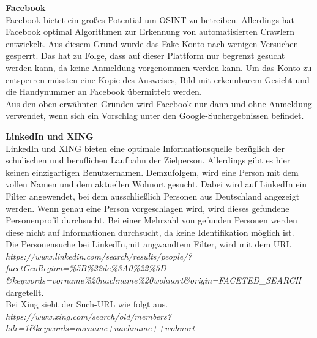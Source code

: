 			\textbf{Facebook}\\
			Facebook bietet ein großes Potential um OSINT zu betreiben. Allerdings hat Facebook optimal Algorithmen zur Erkennung von automatisierten Crawlern entwickelt. Aus diesem Grund wurde das Fake-Konto nach wenigen Versuchen gesperrt. Das hat zu Folge, dass auf dieser Plattform nur begrenzt gesucht werden kann, da keine Anmeldung vorgenommen werden kann. Um das Konto zu entsperren müssten eine Kopie des Ausweises, Bild mit erkennbarem Gesicht und die Handynummer an Facebook übermittelt werden.\\
			Aus den oben erwähnten Gründen wird Facebook nur dann und ohne Anmeldung verwendet, wenn sich ein Vorschlag unter den Google-Suchergebnissen befindet.

			\textbf{LinkedIn und XING}\\
			LinkedIn und XING bieten eine optimale Informationsquelle bezüglich der schulischen und beruflichen Laufbahn der Zielperson. Allerdings gibt es hier keinen einzigartigen Benutzernamen. Demzufolgem, wird eine Person mit dem vollen Namen und dem aktuellen Wohnort gesucht. Dabei wird auf LinkedIn ein Filter angewendet, bei dem ausschließlich Personen aus Deutschland angezeigt werden. Wenn genau eine Person vorgeschlagen wird, wird dieses gefundene Personenprofil durchsucht. Bei einer Mehrzahl von gefunden Personen werden diese nicht auf Informationen durchsucht, da keine Identifikation möglich ist.\\
			Die Personensuche bei LinkedIn,mit angwandtem Filter, wird mit dem URL\\ \textit{https://www.linkedin.com/search/results/people/?facetGeoRegion=\%5B\%22de\%3A0\%22\%5D\\
				\&keywords=vorname\%20nachname\%20wohnort\&origin=FACETED\_SEARCH} dargetellt. \\
			Bei Xing sieht der Such-URL wie folgt aus.\\			
			\textit{https://www.xing.com/search/old/members?hdr=1\&keywords=vorname+nachname++wohnort}
			
			
